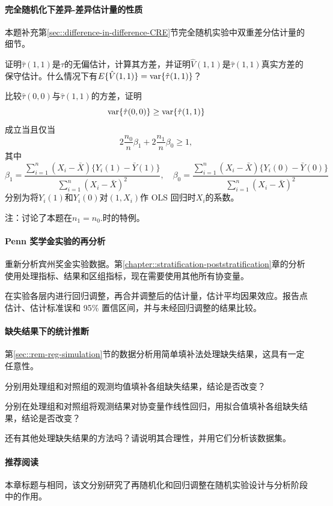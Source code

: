 \paragraph{完全随机化下差异-差异估计量的性质}\label{hw::did-CRE}

本题补充第\ref{sec::difference-in-difference-CRE}节完全随机实验中双重差分估计量的细节。 

证明$\hat{\tau}(1,1) $是$\tau$的无偏估计，计算其方差，并证明$\hat{V}( 1,1 ) $是$\hat{\tau}(1,1) $真实方差的保守估计。什么情况下有$E\{\hat{V}( 1,1 ) \} = \textup{var}\{  \hat{\tau}(1,1)  \}$？



比较$\hat{\tau}(0,0) $与$\hat{\tau}(1,1) $的方差，证明
$$
\textup{var}\{ \hat{\tau}(0,0) \}  \geq \textup{var}\{  \hat{\tau}(1,1)  \}
$$
成立当且仅当
$$
2 \frac{n_0}{n} \beta_1 + 2\frac{n_1}{n} \beta_0 \geq 1,
$$
其中
$$
\beta_1 = \frac{\sum_{i=1}^n (X_i-\bar{X})\{  Y_i(1)-\bar{Y}(1) \}  }{  \sum_{i=1}^n (X_i-\bar{X})^2 },\quad
\beta_0 = \frac{\sum_{i=1}^n (X_i-\bar{X})\{  Y_i(0)-\bar{Y}(0) \}  }{  \sum_{i=1}^n (X_i-\bar{X})^2 }
$$
分别为将$Y_i(1)$和$Y_i(0)$对$(1,X_i)$作 OLS 回归时$X_i$的系数。 


注：\citet[][page 28]{gerber2012field}讨论了本题在$n_1=n_0.$时的特例。



\paragraph{Penn 奖学金实验的再分析}

 
重新分析宾州奖金实验数据。第\ref{chapter::stratification-poststratification}章的分析使用处理指标、结果和区组指标，现在需要使用其他所有协变量。 

在实验各层内进行回归调整，再合并调整后的估计量，估计平均因果效应。报告点估计、估计标准误和 95\% 置信区间，并与未经回归调整的结果比较。
 

\paragraph{缺失结果下的统计推断}\label{hw::missing-y-experiments}

第\ref{sec::rem-reg-simulation}节的数据分析用简单填补法处理缺失结果，这具有一定任意性。 

分别用处理组和对照组的观测均值填补各组缺失结果，结论是否改变？

分别在处理组和对照组将观测结果对协变量作线性回归，用拟合值填补各组缺失结果，结论是否改变？ 

还有其他处理缺失结果的方法吗？请说明其合理性，并用它们分析该数据集。




\paragraph{推荐阅读}

本章标题与\citet{li2019rerandomization}相同，该文分别研究了再随机化和回归调整在随机实验设计与分析阶段中的作用。 


